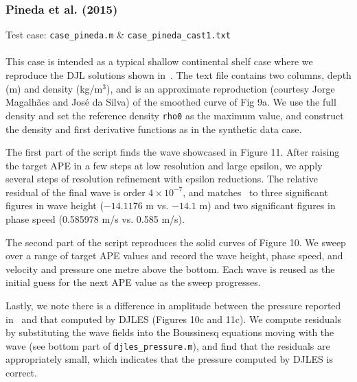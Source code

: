 \documentclass[letterpaper]{article}
\begin{document}
\subsubsection{Pineda et al. (2015)}
Test case: \verb"case_pineda.m" \&  \verb"case_pineda_cast1.txt" \\\\
This case is intended as a typical shallow continental shelf case where we reproduce the DJL solutions shown in~\cite{PinedaEtAl2015}.
The text file contains two columns, depth (m) and density (kg/m$^3$), and is an approximate reproduction (courtesy Jorge Magalh\~aes and Jos\'e da Silva) of the smoothed curve of Fig 9a.
We use the full density and set the reference density \verb+rho0+ as the maximum value, and construct the density and first derivative functions as in the synthetic data case.

The first part of the script finds the wave showcased in Figure 11.
After raising the target APE in a few steps at low resolution and large epsilon, we apply several steps of resolution refinement with epsilon reductions.
The relative residual of the final wave is order $4\times 10^{-7}$, and matches~\cite{PinedaEtAl2015} to three significant figures in wave height ($-14.1176$ m vs. $-14.1$ m) and two significant figures in phase speed (0.585978 m/s vs. 0.585 m/s).

The second part of the script reproduces the solid curves of Figure 10.
We sweep over a range of target APE values and record the wave height, phase speed, and velocity and pressure one metre above the bottom.
Each wave is reused as the initial guess for the next APE value as the sweep progresses. 

Lastly, we note there is a difference in amplitude between the pressure reported in~\cite{PinedaEtAl2015} and that computed by DJLES (Figures 10c and 11c).
We compute residuals by substituting the wave fields into the Boussinesq equations moving with the wave (see bottom part of \verb+djles_pressure.m+), and find that the residuals are appropriately small, which indicates that the pressure computed by DJLES is correct.



\end{document}
